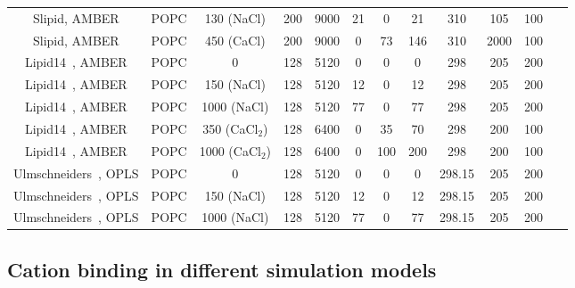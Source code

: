 \documentclass[twoside,twocolumn,9pt]{article}
\begin{document}
\begin{table}
\begin{tabular}{c c c c c c c c c c c c}
  Slipid\cite{jambeck12b}, AMBER\cite{smith94}  &  POPC & 130 (NaCl) & 200 & 9000 & 21 & 0  & 21 & 310 & 105 & 100 &~\cite{slipidsFILESpopc130mMnaclSD}  \\
  Slipid\cite{jambeck12b}, AMBER\cite{aqvist90}  &  POPC & 450 (CaCl) & 200 & 9000  & 0 & 73  & 146 & 310 & 2000 & 100 &~\cite{slipidsFILESpopc450mMcacl}  \\
  \hline
  Lipid14~\cite{dickson14}, AMBER\cite{aqvist90}  &   POPC & 0          & 128 & 5120 & 0 & 0  & 0 & 298 & 205 & 200 &~\cite{lipid14POPC0mMNaClfiles}  \\
  Lipid14~\cite{dickson14}, AMBER\cite{aqvist90}   &   POPC & 150 (NaCl) & 128 & 5120 & 12 & 0 & 12 & 298 & 205 & 200 &~\cite{lipid14POPC150mMNaClfiles}  \\
  Lipid14~\cite{dickson14}, AMBER\cite{aqvist90}   &   POPC & 1000 (NaCl) & 128 & 5120 & 77 & 0 & 77 & 298 & 205 & 200 &~\cite{lipid14POPC1000mMNaClfiles}  \\
  Lipid14~\cite{dickson14}, AMBER\cite{aqvist90}   &   POPC & 350 (CaCl$_2$) & 128 & 6400 & 0 & 35 & 70 & 298 & 200 & 100 &~\cite{lipid14POPC350mMCaClfiles}  \\
  Lipid14~\cite{dickson14}, AMBER\cite{aqvist90}   &   POPC & 1000 (CaCl$_2$) & 128 & 6400 & 0 & 100 & 200 & 298 & 200 & 100 &~\cite{lipid14POPC1000mMCaClfiles}  \\
  \hline
  Ulmschneiders~\cite{Ulmschneider09}, OPLS\cite{aqvist90}       &   POPC & 0          & 128 & 5120 & 0 & 0  & 0 & 298.15 & 205 & 200 &~\cite{ulmschneiderPOPC0mMNaClfiles}  \\
  Ulmschneiders~\cite{Ulmschneider09}, OPLS\cite{aqvist90}       &   POPC & 150 (NaCl) & 128 & 5120 & 12 & 0  & 12 & 298.15 & 205 & 200 &~\cite{ulmschneiderPOPC150mMNaClfiles}  \\
  Ulmschneiders~\cite{Ulmschneider09}, OPLS\cite{aqvist90}       &   POPC & 1000 (NaCl) & 128 & 5120 & 77 & 0  & 77 & 298.15 & 205 & 200 &~\cite{ulmschneiderPOPC1000mMNaClfiles}  \\
\end{tabular}
\end{table} 








\subsection{Cation binding in different simulation models}
\end{document}
